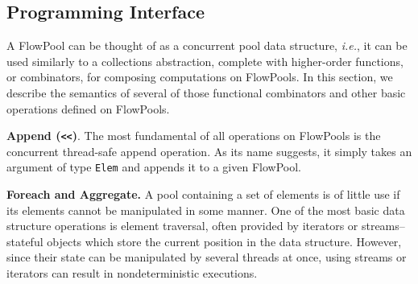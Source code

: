 

\vspace{-0.3cm}
\subsection{Programming Interface}
\label{sec:programming-interface}

A FlowPool can be thought of as a concurrent pool data structure,
\textit{i.e.}, it can be used similarly to a collections abstraction, complete
with higher-order functions, or combinators, for composing computations on
FlowPools. In this section, we describe the semantics of several of those
functional combinators  and other basic operations defined on FlowPools.

\textbf{Append (\texttt{<<})}. The most fundamental of all
operations on FlowPools is the concurrent thread-safe append operation.
As its name suggests, it
simply takes an argument of type \texttt{Elem} and appends it to a given
FlowPool.



\textbf{Foreach and Aggregate.}
A pool containing a set of elements is of little use if its elements cannot be
manipulated in some manner. One of the most basic data structure operations is
element traversal, often provided by iterators or streams-- stateful objects
which store the current position in the data structure. However, since their
state can be manipulated by several threads at once, using streams or iterators can
result in nondeterministic executions.

